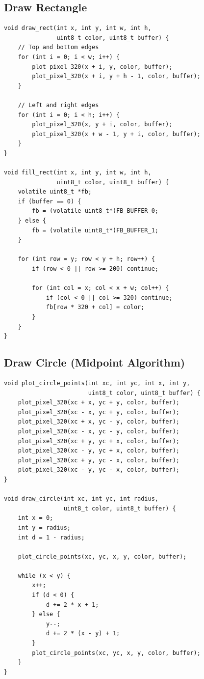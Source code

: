 \documentclass[11pt,letterpaper]{report}
\begin{document}
\subsection{Draw Rectangle}

\begin{lstlisting}[style=c,caption={Rectangle Drawing}]
void draw_rect(int x, int y, int w, int h, 
               uint8_t color, uint8_t buffer) {
    // Top and bottom edges
    for (int i = 0; i < w; i++) {
        plot_pixel_320(x + i, y, color, buffer);
        plot_pixel_320(x + i, y + h - 1, color, buffer);
    }
    
    // Left and right edges
    for (int i = 0; i < h; i++) {
        plot_pixel_320(x, y + i, color, buffer);
        plot_pixel_320(x + w - 1, y + i, color, buffer);
    }
}

void fill_rect(int x, int y, int w, int h, 
               uint8_t color, uint8_t buffer) {
    volatile uint8_t *fb;
    if (buffer == 0) {
        fb = (volatile uint8_t*)FB_BUFFER_0;
    } else {
        fb = (volatile uint8_t*)FB_BUFFER_1;
    }
    
    for (int row = y; row < y + h; row++) {
        if (row < 0 || row >= 200) continue;
        
        for (int col = x; col < x + w; col++) {
            if (col < 0 || col >= 320) continue;
            fb[row * 320 + col] = color;
        }
    }
}
\end{lstlisting}

\subsection{Draw Circle (Midpoint Algorithm)}

\begin{lstlisting}[style=c,caption={Circle Drawing}]
void plot_circle_points(int xc, int yc, int x, int y, 
                        uint8_t color, uint8_t buffer) {
    plot_pixel_320(xc + x, yc + y, color, buffer);
    plot_pixel_320(xc - x, yc + y, color, buffer);
    plot_pixel_320(xc + x, yc - y, color, buffer);
    plot_pixel_320(xc - x, yc - y, color, buffer);
    plot_pixel_320(xc + y, yc + x, color, buffer);
    plot_pixel_320(xc - y, yc + x, color, buffer);
    plot_pixel_320(xc + y, yc - x, color, buffer);
    plot_pixel_320(xc - y, yc - x, color, buffer);
}

void draw_circle(int xc, int yc, int radius, 
                 uint8_t color, uint8_t buffer) {
    int x = 0;
    int y = radius;
    int d = 1 - radius;
    
    plot_circle_points(xc, yc, x, y, color, buffer);
    
    while (x < y) {
        x++;
        if (d < 0) {
            d += 2 * x + 1;
        } else {
            y--;
            d += 2 * (x - y) + 1;
        }
        plot_circle_points(xc, yc, x, y, color, buffer);
    }
}
\end{lstlisting}
\end{document}
